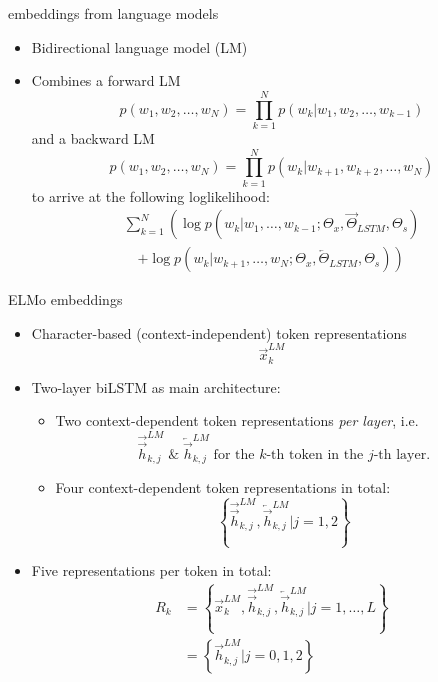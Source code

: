 \documentclass[11pt,compress,t,notes=noshow, xcolor=table]{beamer}
\begin{document}

\begin{vbframe}{embeddings from language models}

\vfill

\begin{itemize}
		\item Bidirectional language model (LM)
		\item Combines a forward LM $$p\left(w_{1}, w_{2}, \ldots, w_{N}\right)=\prod_{k=1}^{N} p\left(w_{k} | w_{1}, w_{2}, \ldots, w_{k-1}\right)$$
					and a backward LM $$p\left(w_{1}, w_{2}, \ldots, w_{N}\right)=\prod_{k=1}^{N} p\left(w_{k} | w_{k+1}, w_{k+2}, \ldots, w_{N}\right)$$
					to arrive at the following loglikelihood:
					$$\begin{array}{l}
\sum_{k=1}^{N}\left(\log p\left(w_{k} | w_{1}, \ldots, w_{k-1} ; \Theta_{x}, \overrightarrow{\Theta}_{L S T M}, \Theta_{s}\right)\right. \\
\quad\left. +\log p\left(w_{k} | w_{k+1}, \ldots, w_{N} ; \Theta_{x}, \overleftarrow{\Theta}_{L S T M}, \Theta_{s}\right)\right)
\end{array}$$
	\end{itemize}

\vfill

\end{vbframe}


\begin{vbframe}{ELMo embeddings}

\vfill

	\begin{itemize}
		\item Character-based (context-independent) token representations $$\vec x_k^{LM}$$
		\item Two-layer biLSTM as main architecture:
			\begin{itemize}
				\item Two context-dependent token representations \textit{per layer}, i.e.
							$$\overrightarrow{\vec h}_{k, j}^{L M}\; \mbox{\&}\; \overleftarrow{\vec h}_{k, j}^{L M}\; \mbox{for the $k$-th token in the $j$-th layer.}$$
				\item Four context-dependent token representations in total: 
							$$\left\{\overrightarrow{\vec h}_{k, j}^{L M}, \overleftarrow{\vec h}_{k, j}^{L M} | j = 1, 2\right\}$$
			\end{itemize}
		\item Five representations per token in total:
					$$\begin{aligned}
R_{k} &=\left\{\vec x_{k}^{L M}, \overrightarrow{\vec h}_{k, j}^{L M}, \overleftarrow{\vec h}_{k, j}^{L M} | j=1, \ldots, L\right\} \\
&=\left\{\vec h_{k, j}^{L M} | j = 0, 1, 2\right\}
\end{aligned}$$
	\end{itemize}

\vfill

\end{vbframe}
\end{document}
